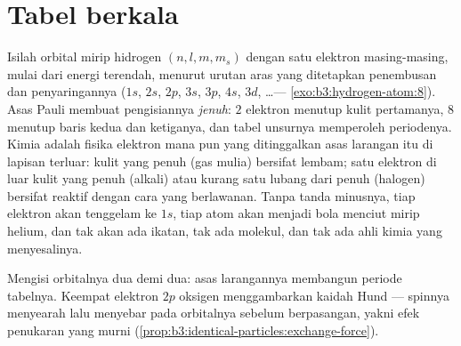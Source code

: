 \section{Tabel berkala}

\begin{proposition}\label{prop:b3:identical-particles:periodic}
Isilah orbital mirip hidrogen $(n, l, m, m_s)$ dengan satu elektron
masing-masing, mulai dari energi terendah, menurut urutan aras yang
ditetapkan penembusan dan penyaringannya ($1s$, $2s$, $2p$, $3s$, $3p$,
$4s$, $3d$, \dots --- \cref{exo:b3:hydrogen-atom:8}). Asas Pauli membuat
pengisiannya \emph{jenuh}: $2$ elektron menutup kulit pertamanya, $8$
menutup baris kedua dan ketiganya, dan tabel unsurnya memperoleh
periodenya. Kimia adalah fisika elektron mana pun yang ditinggalkan asas
larangan itu di lapisan terluar: kulit yang penuh (gas mulia) bersifat
lembam; satu elektron di luar kulit yang penuh (alkali) atau kurang satu
lubang dari penuh (halogen) bersifat reaktif dengan cara yang
berlawanan. Tanpa tanda minusnya, tiap elektron akan tenggelam ke $1s$,
tiap atom akan menjadi bola menciut mirip helium, dan tak akan ada
ikatan, tak ada molekul, dan tak ada ahli kimia yang menyesalinya.
\end{proposition}
\admitted

\begin{omfigure}

{\small Mengisi orbitalnya dua demi dua: asas larangannya membangun
periode tabelnya. Keempat elektron $2p$ oksigen menggambarkan kaidah
Hund --- spinnya menyearah lalu menyebar pada orbitalnya sebelum
berpasangan, yakni efek penukaran yang murni
(\cref{prop:b3:identical-particles:exchange-force}).}
\end{omfigure}


